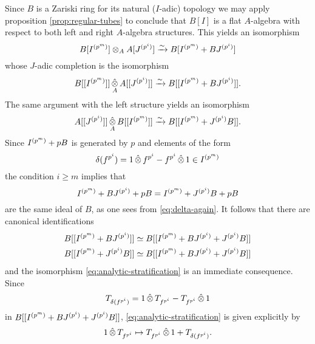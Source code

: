 \documentclass{article}
\theoremstyle{change}
\numberwithin{equation}{subsubsection}
\begin{document}
Since $B$ is a Zariski ring for its natural ($I$-adic) topology
we may apply proposition \ref{prop:regular-tubes} to conclude that
$B[I]$ is a flat $A$-algebra with respect to both left and right
$A$-algebra structures. This yields an isomorphism
\begin{displaymath}
  B[{I}^{({p^m})}]\otimes_AA[{J}^{({p^i})}]
  \xrightarrow{\sim} B[{I}^{({p^m})}+B{J}^{({p^i})}]
\end{displaymath}
whose $J$-adic completion is the isomorphism
\begin{equation}
  \label{eq:[X]_m,i}
  B[[{I}^{({p^m})}]]\mathop{\hat\otimes}_AA[[{J}^{({p^i})}]]
  \xrightarrow{\sim} B[[{I}^{({p^m})}+B{J}^{({p^i})}]].  
\end{equation}
The same argument with the left structure yields an isomorphism
\begin{displaymath}
  A[[{J}^{({p^i})}]]\mathop{\hat\otimes}_AB[[{I}^{({p^m})}]]
  \xrightarrow{\sim} B[[{I}^{({p^m})}+{J}^{({p^i})}B]].
\end{displaymath}
Since ${I}^{({p^m})}+pB$ is generated by $p$ and elements of the
form
\begin{equation}
  \label{eq:delta-again}
\delta(f^{p^i})=1\mathop{\hat\otimes} f^{p^i}-f^{p^i}\mathop{\hat\otimes}1\in{I}^{({p^m})}
\end{equation}
the condition $i\ge m$ implies that
\begin{displaymath}
  {I}^{({p^m})}+B{J}^{({p^i})}+pB
  ={I}^{({p^m})}+{J}^{({p^i})}B+pB  
\end{displaymath}
are the same ideal of $B$, as one sees from \ref{eq:delta-again}. It
follows that there are canonical identifications
\begin{equation}
  \label{eq:analytic-stratification-in-steps}
  \begin{split}
    B[[{I}^{({p^m})}+B{J}^{({p^i})}]]&\simeq
    B[[{I}^{({p^m})}+B{J}^{({p^i})}+{J}^{({p^i})}B]]\\
    B[[{I}^{({p^m})}+{J}^{({p^i})}B]]&\simeq
    B[[{I}^{({p^m})}+B{J}^{({p^i})}+{J}^{({p^i})}B]]
  \end{split}
\end{equation}
and the isomorphism \ref{eq:analytic-stratification} is an immediate
consequence. Since
\begin{displaymath}
  T_{\delta(f^{p^i})}=
  1\mathop{\hat\otimes} T_{f^{p^i}}-T_{f^{p^i}}\mathop{\hat\otimes}1
\end{displaymath}
in $B[[{I}^{({p^m})}+B{J}^{({p^i})}+{J}^{({p^i})}B]]$,
\ref{eq:analytic-stratification} is given explicitly by
\begin{equation}
  \label{eq:analytic-stratification-explicit}
  1\mathop{\hat\otimes} T_{f^{p^i}}\mapsto
  T_{f^{p^i}}\mathop{\hat\otimes}1+T_{\delta(f^{p^i})}.
\end{equation}
\end{document}
